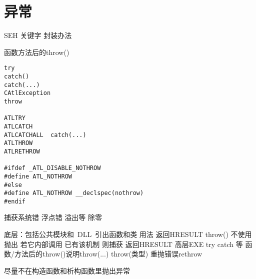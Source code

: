 ﻿%
%

\chapter{异常}

SEH
关键字
封装办法

函数方法后的throw()

\ttfamily
\begin{lstlisting}
try
catch()
catch(...)
CAtlException
throw

ATLTRY
ATLCATCH
ATLCATCHALL  catch(...)
ATLTHROW
ATLRETHROW

#ifdef _ATL_DISABLE_NOTHROW
#define ATL_NOTHROW
#else
#define ATL_NOTHROW __declspec(nothrow)
#endif
\end{lstlisting}

捕获系统错 浮点错 溢出等 除零

底层：包括公共模块和~DLL~引出函数和类
用法 返回HRESULT   throw() 不使用抛出 若它内部调用
已有该机制 则捕获 返回HRESULT
高层EXE try catch 等
函数/方法后的throw()说明throw(...)  throw(类型)
重抛错误rethrow

尽量不在构造函数和析构函数里抛出异常
